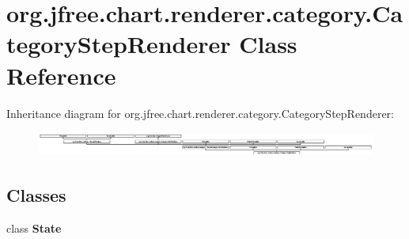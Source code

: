 \hypertarget{classorg_1_1jfree_1_1chart_1_1renderer_1_1category_1_1_category_step_renderer}{}\section{org.\+jfree.\+chart.\+renderer.\+category.\+Category\+Step\+Renderer Class Reference}
\label{classorg_1_1jfree_1_1chart_1_1renderer_1_1category_1_1_category_step_renderer}
Inheritance diagram for org.\+jfree.\+chart.\+renderer.\+category.\+Category\+Step\+Renderer\+:\begin{figure}[H]
\begin{center}
\leavevmode
\includegraphics[height=0.824742cm]{classorg_1_1jfree_1_1chart_1_1renderer_1_1category_1_1_category_step_renderer}
\end{center}
\end{figure}
\subsection*{Classes}
\begin{DoxyCompactItemize}
\item 
class {\bfseries State}
\end{DoxyCompactItemize}
